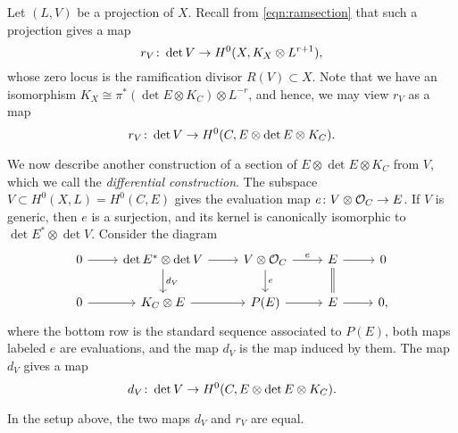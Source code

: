 Let $(L, V)$ be a projection of $X$.
Recall from \eqref{eqn:ramsection} that such a projection gives a map
\[ r_V {\colon} \det V \to H^0(X, K_X \otimes L^{r+1}),\]
whose zero locus is the ramification divisor $R(V) \subset X$.
Note that we have an isomorphism $K_X \cong \pi^* (\det E \otimes K_C) \otimes L^{-r}$, and hence, we may view $r_V$ as a map
\[ r_V {\colon} \det V \to H^0(C, E \otimes \det E \otimes K_C).\]

We now describe another construction of a section of $E \otimes \det E \otimes K_C$ from $V$, which we call the \emph{differential construction}.
The subspace $V \subset H^0(X, L) = H^0(C, E)$ gives the evaluation map
$e {\colon} V \otimes \mathcal O_C \to E$.
If $V$ is generic, then $e$ is a surjection, and its kernel is canonically isomorphic to $\det E^* \otimes \det V$.
Consider the diagram
\begin{equation}\label{eqn:differential_construction}
\begin{tikzcd}
  0 \arrow{r}& \det E^* \otimes \det V \arrow{r}\arrow{d}{d_V}& V \otimes \O_C \arrow{r}{e}\arrow{d}{e}& E \arrow{r}\arrow[equal]{d}& 0 \\
  0 \arrow{r}& K_C \otimes E \arrow{r}& P(E) \arrow{r}& E \arrow{r}& 0,
\end{tikzcd}
\end{equation}
where the bottom row is the standard sequence associated to $P(E)$, both maps labeled $e$ are evaluations, and the map $d_V$ is the map induced by them.
The map $d_V$ gives a map
\[ d_V {\colon} \det V \to H^0(C, E \otimes \det E \otimes K_C).\]
\begin{proposition}\label{prop:rdv}
  In the setup above, the two maps $d_V$ and $r_V$ are equal.
\end{proposition}
